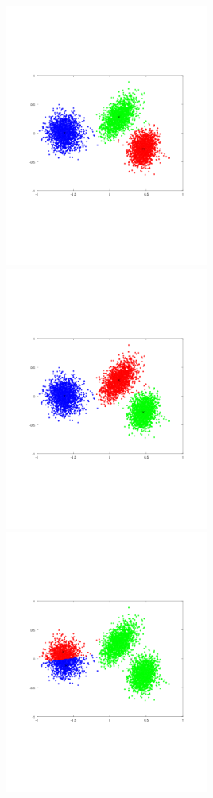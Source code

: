 \documentclass[11pt]{article}
\begin{document}
\includegraphics[width=0.5\textwidth]{q4/k3_1.png}
\includegraphics[width=0.5\textwidth]{q4/k3_2.png}
\includegraphics[width=0.5\textwidth]{q4/k3_3.png}
\end{document}
